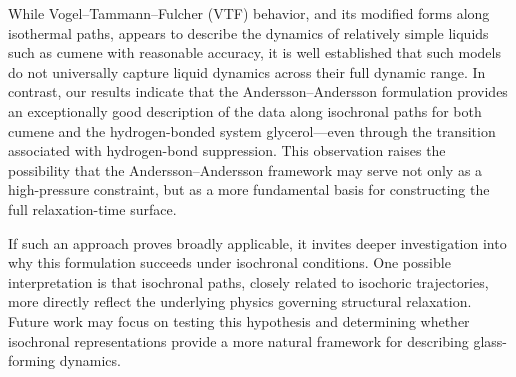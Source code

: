 While Vogel--Tammann--Fulcher (VTF) behavior, and its modified forms along isothermal paths, appears to describe the dynamics of relatively simple liquids such as cumene with reasonable accuracy, it is well established that such models do not universally capture liquid dynamics across their full dynamic range. In contrast, our results indicate that the Andersson--Andersson formulation provides an exceptionally good description of the data along isochronal paths for both cumene and the hydrogen-bonded system glycerol---even through the transition associated with hydrogen-bond suppression. This observation raises the possibility that the Andersson--Andersson framework may serve not only as a high-pressure constraint, but as a more fundamental basis for constructing the full relaxation-time surface.

If such an approach proves broadly applicable, it invites deeper investigation into why this formulation succeeds under isochronal conditions. One possible interpretation is that isochronal paths, closely related to isochoric trajectories, more directly reflect the underlying physics governing structural relaxation. Future work may focus on testing this hypothesis and determining whether isochronal representations provide a more natural framework for describing glass-forming dynamics.